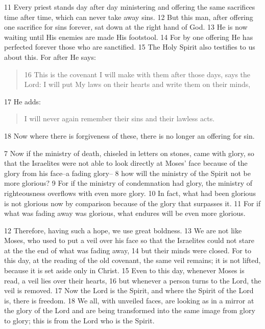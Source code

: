 \begin{bible}
11 Every priest stands day after day ministering and offering the same sacrifices time after time, which can never take away sins. 12 But this man, after offering one sacrifice for sins forever, sat down at the right hand of God. 13 He is now waiting until His enemies are made His footstool. 14 For by one offering He has perfected forever those who are sanctified. 15 The Holy Spirit also testifies to us about this. For after He says:
\begin{quote}
16 This is the covenant I will make with them
after those days, says the Lord:
I will put My laws on their hearts
and write them on their minds,
\end{quote}
17 He adds:
\begin{quote}
I will never again remember
their sins and their lawless acts.
\end{quote}
18 Now where there is forgiveness of these, there is no longer an offering for sin.


7 Now if the ministry of death, chiseled in letters on stones, came with glory, so that the Israelites were not able to look directly at Moses' face because of the glory from his face--a fading glory-- 8 how will the ministry of the Spirit not be more glorious? 9 For if the ministry of condemnation had glory, the ministry of righteousness overflows with even more glory. 10 In fact, what had been glorious is not glorious now by comparison because of the glory that surpasses it. 11 For if what was fading away was glorious, what endures will be even more glorious.

12 Therefore, having such a hope, we use great boldness. 13 We are not like Moses, who used to put a veil over his face so that the Israelites could not stare at the the end of what was fading away, 14 but their minds were closed. For to this day, at the reading of the old covenant, the same veil remains; it is not lifted, because it is set aside only in Christ. 15 Even to this day, whenever Moses is read, a veil lies over their hearts, 16 but whenever a person turns to the Lord, the veil is removed. 17 Now the Lord is the Spirit, and where the Spirit of the Lord is, there is freedom. 18 We all, with unveiled faces, are looking as in a mirror at the glory of the Lord and are being transformed into the same image from glory to glory; this is from the Lord who is the Spirit.
\end{bible}

